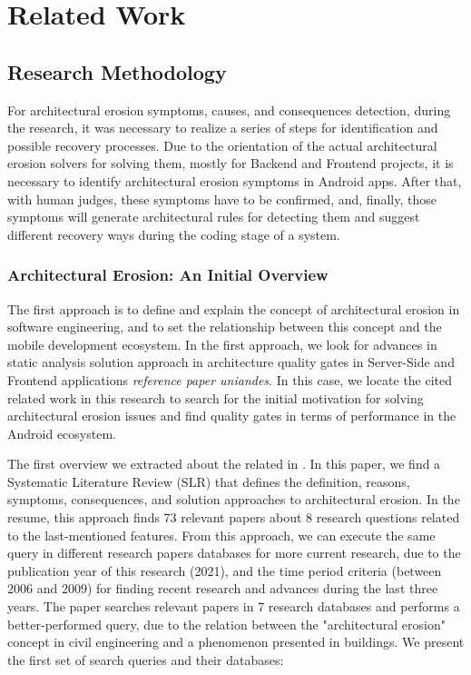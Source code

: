 \chapter{Related Work}
\label{cha:relatedwork}

\section{Research Methodology}
For architectural erosion symptoms, causes, and consequences detection, during the research, it was necessary to realize a series of steps for identification and possible recovery processes. Due to the orientation of the actual architectural erosion solvers for solving them, mostly for Backend and Frontend projects, it is necessary to identify architectural erosion symptoms in Android apps. After that, with human judges, these symptoms have to be confirmed, and, finally, those symptoms will generate architectural rules for detecting them and suggest different recovery ways during the coding stage of a system.

\subsection{Architectural Erosion: An Initial Overview}
The first approach is to define and explain the concept of architectural erosion in software engineering, and to set the relationship between this concept and the mobile development ecosystem. In the first approach, we look for advances in static analysis solution approach in architecture quality gates in Server-Side and Frontend applications \emph{reference paper uniandes}. In this case, we locate the cited related work in this research to search for the initial motivation for solving architectural erosion issues and find quality gates in terms of performance in the Android ecosystem.

The first overview we extracted about the related in \citet{slr-base}. In this paper, we find a Systematic Literature Review (SLR) that defines the definition, reasons, symptoms, consequences, and solution approaches to architectural erosion. In the resume, this approach finds 73 relevant papers about 8 research questions related to the last-mentioned features. From this approach, we can execute the same query in different research papers databases for more current research, due to the publication year of this research (2021), and the time period criteria (between 2006 and 2009) for finding recent research and advances during the last three years. The paper searches relevant papers in 7 research databases and performs a better-performed query, due to the relation between the "architectural erosion" concept in civil engineering and a phenomenon presented in buildings. We present the first set of search queries and their databases:

